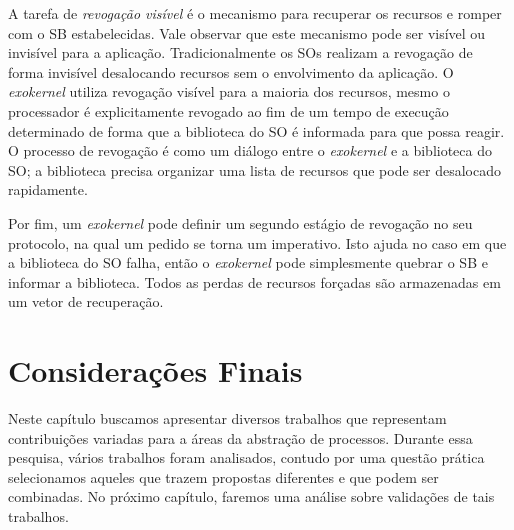 A tarefa de \emph{revogação visível} é o mecanismo para recuperar os recursos
e romper com o SB estabelecidas. Vale observar que este mecanismo pode ser
visível ou invisível para a aplicação. Tradicionalmente os SOs realizam a
revogação de forma invisível desalocando recursos sem o envolvimento da
aplicação. O \emph{exokernel} utiliza revogação visível para a maioria dos
recursos, mesmo o processador é explicitamente revogado ao fim de um tempo de
execução determinado de forma que a biblioteca do SO é informada para que possa
reagir. O processo de revogação é como um diálogo entre o \emph{exokernel} e a
biblioteca do SO; a biblioteca precisa organizar uma lista de recursos que pode
ser desalocado rapidamente.

Por fim, um \emph{exokernel} pode definir um segundo estágio de revogação no
seu protocolo, na qual um pedido se torna um imperativo. Isto ajuda no caso em
que a biblioteca do SO falha, então o \emph{exokernel} pode simplesmente
quebrar o SB e informar a biblioteca. Todos as perdas de recursos forçadas são
armazenadas em um vetor de recuperação.

% 

\section{Considerações Finais}

Neste capítulo buscamos apresentar diversos trabalhos que representam
contribuições variadas para a áreas da abstração de processos. Durante essa
pesquisa, vários trabalhos foram analisados, contudo por uma questão prática
selecionamos aqueles que trazem propostas diferentes e que podem ser
combinadas. No próximo capítulo, faremos uma análise sobre validações de tais
trabalhos.

